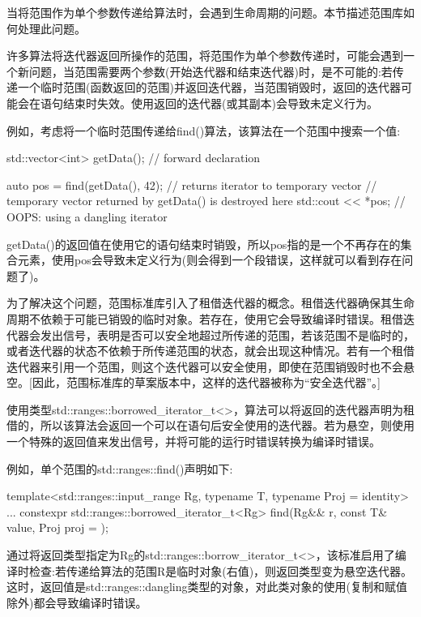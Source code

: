 

当将范围作为单个参数传递给算法时，会遇到生命周期的问题。本节描述范围库如何处理此问题。


许多算法将迭代器返回所操作的范围，将范围作为单个参数传递时，可能会遇到一个新问题，当范围需要两个参数(开始迭代器和结束迭代器)时，是不可能的:若传递一个临时范围(函数返回的范围)并返回迭代器，当范围销毁时，返回的迭代器可能会在语句结束时失效。使用返回的迭代器(或其副本)会导致未定义行为。

例如，考虑将一个临时范围传递给find()算法，该算法在一个范围中搜索一个值:

\begin{cpp}
std::vector<int> getData(); // forward declaration

auto pos = find(getData(), 42); // returns iterator to temporary vector
// temporary vector returned by getData() is destroyed here
std::cout << *pos; // OOPS: using a dangling iterator
\end{cpp}

getData()的返回值在使用它的语句结束时销毁，所以pos指的是一个不再存在的集合元素，使用pos会导致未定义行为(则会得到一个段错误，这样就可以看到存在问题了)。

为了解决这个问题，范围标准库引入了租借迭代器的概念。租借迭代器确保其生命周期不依赖于可能已销毁的临时对象。若存在，使用它会导致编译时错误。租借迭代器会发出信号，表明是否可以安全地超过所传递的范围，若该范围不是临时的，或者迭代器的状态不依赖于所传递范围的状态，就会出现这种情况。若有一个租借迭代器来引用一个范围，则这个迭代器可以安全使用，即使在范围销毁时也不会悬空。[因此，范围标准库的草案版本中，这样的迭代器被称为“安全迭代器”。]

使用类型std::ranges::borrowed\_iterator\_t<>，算法可以将返回的迭代器声明为租借的，所以该算法会返回一个可以在语句后安全使用的迭代器。若为悬空，则使用一个特殊的返回值来发出信号，并将可能的运行时错误转换为编译时错误。

例如，单个范围的std::ranges::find()声明如下:

\begin{cpp}
template<std::ranges::input_range Rg,
			typename T,
			typename Proj = identity>
...
constexpr std::ranges::borrowed_iterator_t<Rg>
	find(Rg&& r, const T& value, Proj proj = {});
\end{cpp}

通过将返回类型指定为Rg的std::ranges::borrow\_iterator\_t<>，该标准启用了编译时检查:若传递给算法的范围R是临时对象(右值)，则返回类型变为悬空迭代器。这时，返回值是std::ranges::dangling类型的对象，对此类对象的使用(复制和赋值除外)都会导致编译时错误。

